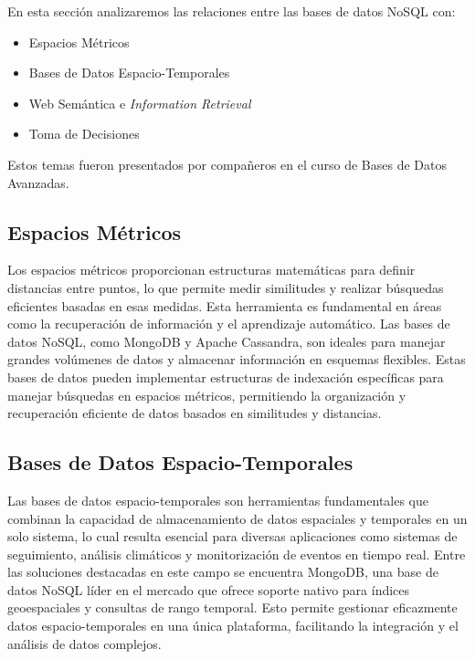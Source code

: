 \documentclass[pdflatex,sn-mathphys-num]{sn-jnl}
\theoremstyle{thmstyleone}%
\theoremstyle{thmstyletwo}%
\theoremstyle{thmstylethree}%
\begin{document}
En esta sección analizaremos las relaciones entre las bases de datos NoSQL con:

\begin{itemize}
    \item Espacios Métricos
    \item Bases de Datos Espacio-Temporales
    \item Web Semántica e \textit{Information Retrieval}
    \item Toma de Decisiones
\end{itemize}

Estos temas fueron presentados por compañeros en el curso de Bases de Datos Avanzadas.

\subsection{Espacios Métricos}

Los espacios métricos proporcionan estructuras matemáticas para definir distancias entre puntos, lo que permite medir similitudes y realizar búsquedas eficientes basadas en esas medidas. Esta herramienta es fundamental en áreas como la recuperación de información y el aprendizaje automático. Las bases de datos NoSQL, como MongoDB y Apache Cassandra, son ideales para manejar grandes volúmenes de datos y almacenar información en esquemas flexibles. Estas bases de datos pueden implementar estructuras de indexación específicas para manejar búsquedas en espacios métricos, permitiendo la organización y recuperación eficiente de datos basados en similitudes y distancias.

\subsection{Bases de Datos Espacio-Temporales}

Las bases de datos espacio-temporales son herramientas fundamentales que combinan la capacidad de almacenamiento de datos espaciales y temporales en un solo sistema, lo cual resulta esencial para diversas aplicaciones como sistemas de seguimiento, análisis climáticos y monitorización de eventos en tiempo real. Entre las soluciones destacadas en este campo se encuentra MongoDB, una base de datos NoSQL líder en el mercado que ofrece soporte nativo para índices geoespaciales y consultas de rango temporal. Esto permite gestionar eficazmente datos espacio-temporales en una única plataforma, facilitando la integración y el análisis de datos complejos.
\end{document}
